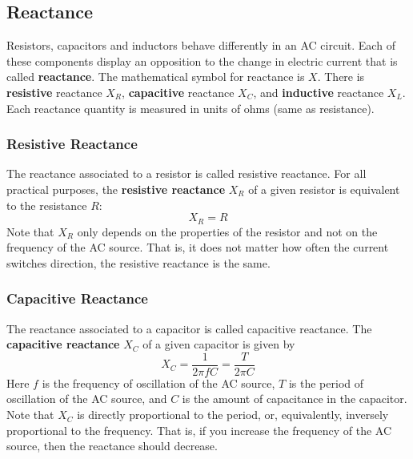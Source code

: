 \subsection{Reactance}
Resistors, capacitors and inductors behave differently in an AC circuit. Each of these components display an opposition to the change in electric current that is called \textbf{reactance}. The mathematical symbol for reactance is $X$. There is \textbf{resistive} reactance $X_{R}$, \textbf{capacitive} reactance $X_{C}$, and \textbf{inductive} reactance $X_{L}$. Each reactance quantity is measured in units of ohms (same as resistance).
\subsubsection{Resistive Reactance}
The reactance associated to a resistor is called resistive reactance. For all practical purposes, the \textbf{resistive reactance} $X_{R}$ of a given resistor is equivalent to the resistance $R$:
\begin{equation} \label{eq.06.reactance.R}
	X_{R} = R
\end{equation}
Note that $X_{R}$ only depends on the properties of the resistor and not on the frequency of the AC source. That is, it does not matter how often the current switches direction, the resistive reactance is the same.
\subsubsection{Capacitive Reactance}
The reactance associated to a capacitor is called capacitive reactance. The \textbf{capacitive reactance} $X_{C}$ of a given capacitor is given by
\begin{equation} \label{eq.06.reactance.C}
	X_{C} = \frac{1}{2 \pi f C} = \frac{T}{2 \pi C}
\end{equation}
Here $f$ is the frequency of oscillation of the AC source, $T$ is the period of oscillation of the AC source, and $C$ is the amount of capacitance in the capacitor. Note that $X_{C}$ is directly proportional to the period, or, equivalently, inversely proportional to the frequency. That is, if you increase the frequency of the AC source, then the reactance should decrease.
